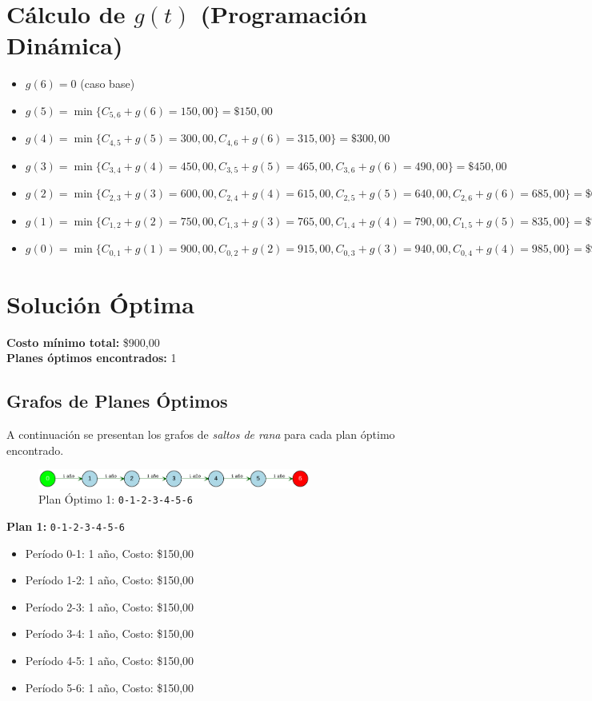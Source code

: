 \documentclass[12pt]{article}
\begin{document}
\section*{Cálculo de $g(t)$ (Programación Dinámica)}
\begin{itemize}
\item $g(6) = 0$ (caso base)
\item $g(5) = \min\{ C_{5,6} + g(6) = 150,00\} = \$150,00$
\item $g(4) = \min\{ C_{4,5} + g(5) = 300,00, C_{4,6} + g(6) = 315,00\} = \$300,00$
\item $g(3) = \min\{ C_{3,4} + g(4) = 450,00, C_{3,5} + g(5) = 465,00, C_{3,6} + g(6) = 490,00\} = \$450,00$
\item $g(2) = \min\{ C_{2,3} + g(3) = 600,00, C_{2,4} + g(4) = 615,00, C_{2,5} + g(5) = 640,00, C_{2,6} + g(6) = 685,00\} = \$600,00$
\item $g(1) = \min\{ C_{1,2} + g(2) = 750,00, C_{1,3} + g(3) = 765,00, C_{1,4} + g(4) = 790,00, C_{1,5} + g(5) = 835,00\} = \$750,00$
\item $g(0) = \min\{ C_{0,1} + g(1) = 900,00, C_{0,2} + g(2) = 915,00, C_{0,3} + g(3) = 940,00, C_{0,4} + g(4) = 985,00\} = \$900,00$
\end{itemize}

\clearpage
\section*{Solución Óptima}
\textbf{Costo mínimo total:} \$900,00\\
\textbf{Planes óptimos encontrados:} 1
\subsection*{Grafos de Planes Óptimos}
A continuación se presentan los grafos de \emph{saltos de rana} para cada plan óptimo encontrado.

\begin{figure}[H]
\centering
\includegraphics[width=0.8\textwidth]{1111_plan_1.png}
\caption{Plan Óptimo 1: \texttt{0-1-2-3-4-5-6}}
\label{fig:plan1}
\end{figure}

\textbf{Plan 1:} \texttt{0-1-2-3-4-5-6}
\begin{itemize}\small
\item Período 0-1: 1 año, Costo: \$150,00
\item Período 1-2: 1 año, Costo: \$150,00
\item Período 2-3: 1 año, Costo: \$150,00
\item Período 3-4: 1 año, Costo: \$150,00
\item Período 4-5: 1 año, Costo: \$150,00
\item Período 5-6: 1 año, Costo: \$150,00
\end{itemize}
\end{document}
